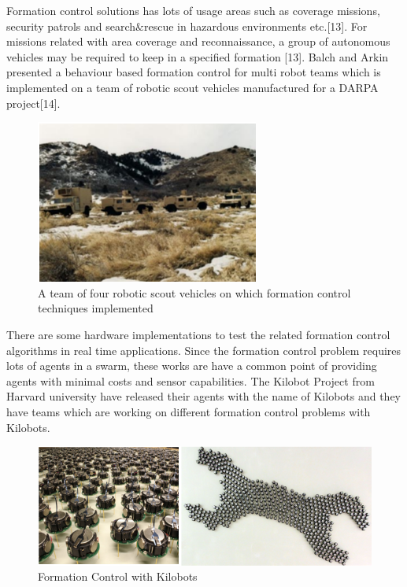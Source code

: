 \documentclass[twoside]{article}
\begin{document}
Formation control solutions has lots of usage areas such as coverage missions, security patrols and search$\&$rescue in hazardous environments etc.[13]. For missions related with area coverage and reconnaissance, a group of autonomous vehicles may be required to keep in a specified formation [13].  Balch and Arkin presented a behaviour based formation control for multi robot teams which is implemented on a team of robotic scout vehicles manufactured for a DARPA project[14]. 


\begin{figure}[H]
	\caption{A team of four robotic scout vehicles on which formation control techniques implemented}
	\centering
	\includegraphics[scale = 1]{scout_robots}
\end{figure} 

There are some hardware implementations to test the related formation control algorithms in real time applications. Since the formation control problem requires lots of agents in a swarm, these works are have a common point of providing agents with minimal costs and sensor capabilities. The Kilobot Project from Harvard university have released their agents with the name of Kilobots and they have teams which are working on different formation control problems with Kilobots.


	\begin{figure}[H]
		\caption{Formation Control with Kilobots}
		\centering
		\includegraphics[scale = 1]{kilobot}
	\end{figure} 
\end{document}
